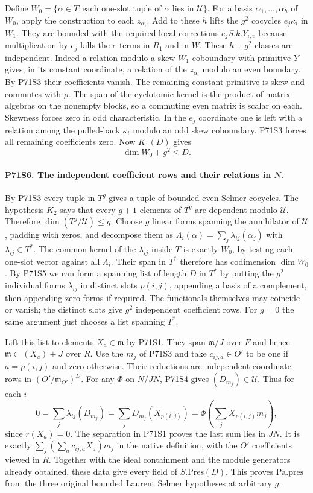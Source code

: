 Define $W_0=\{\alpha\in T:\text{each one-slot tuple of }\alpha
\text{ lies in }\mathcal U\}$. For a basis
$\alpha_1,\ldots,\alpha_h$ of $W_0$, apply the construction to
each $z_{\alpha_i}$. Add to these $h$ lifts the $g^2$ cocycles
$e_j\kappa_i$ in $W_1$. They are bounded with the required
local corrections $e_j S.k.Y_{i,v}$ because multiplication by
$e_j$ kills the $e$-terms in $R_1$ and in $W$. These $h+g^2$
classes are independent. Indeed a relation modulo a skew
$W_1$-coboundary with primitive $Y$ gives, in its constant
coordinate, a relation of the $z_{\alpha_i}$ modulo an even
boundary. By P71S3 their coefficients vanish. The remaining
constant primitive is skew and commutes with $\rho$. The span
of the cyclotomic kernel is the product of matrix algebras on
the nonempty blocks, so a commuting even matrix is scalar on
each. Skewness forces zero in odd characteristic. In the
$e_j$ coordinate one is left with a relation among the pulled-back
$\kappa_i$ modulo an odd skew coboundary. P71S3 forces all
remaining coefficients zero. Now $K_1(D)$ gives
\[
                         \dim W_0+g^2\le D .
\]

\paragraph{P71S6. The independent coefficient rows and their relations in $N$.}
By P71S3 every tuple in $T^g$ gives a tuple of bounded even
Selmer cocycles. The hypothesis $K_2$ says that every $g+1$
elements of $T^g$ are dependent modulo $\mathcal U$. Therefore
$\dim(T^g/\mathcal U)\le g$. Choose $g$ linear forms spanning
the annihilator of $\mathcal U$, padding with zeros, and decompose
them as $\Lambda_i(\alpha)=\sum_j\lambda_{ij}(\alpha_j)$
with $\lambda_{ij}\in T^*$. The common kernel of the
$\lambda_{ij}$ inside $T$ is exactly $W_0$, by testing
each one-slot vector against all $\Lambda_i$. Their span in
$T^*$ therefore has codimension $\dim W_0$. By P71S5 we can
form a spanning list of length $D$ in $T^*$ by putting the
$g^2$ individual forms $\lambda_{ij}$ in distinct slots
$p(i,j)$, appending a basis of a complement, then appending
zero forms if required. The functionals themselves may coincide
or vanish; the distinct slots give $g^2$ independent coefficient
rows. For $g=0$ the same argument just chooses a list spanning
$T^*$.

Lift this list to elements $X_a\in\mathfrak m$ by P71S1.
They span $\mathfrak m/J$ over $F$ and hence
$\mathfrak m\subset (X_a)+J$ over $R$. Use the $m_j$ of
P71S3 and take $c_{ij,a}\in O'$ to be one if $a=p(i,j)$ and
zero otherwise. Their reductions are independent coordinate
rows in $(O'/\mathfrak m_{O'})^D$. For any $\Phi$ on $N/JN$,
P71S4 gives $(D_{m_j})\in\mathcal U$. Thus for each $i$
\[
  0=\sum_j\lambda_{ij}(D_{m_j})
     =\sum_j D_{m_j}(X_{p(i,j)})
     =\Phi\!\left(\sum_j X_{p(i,j)}m_j\right),
\]
since $r(X_a)=0$. The separation in P71S1 proves the last
sum lies in $JN$. It is exactly
$\sum_j(\sum_a c_{ij,a}X_a)m_j$ in the native definition,
with the $O'$ coefficients viewed in $R$. Together with the
ideal containment and the module generators already obtained,
these data give every field of $S.\mathrm{Pres}(D)$.
This proves $\mathrm{Pa.pres}$ from the three original bounded
Laurent Selmer hypotheses at arbitrary $g$.
